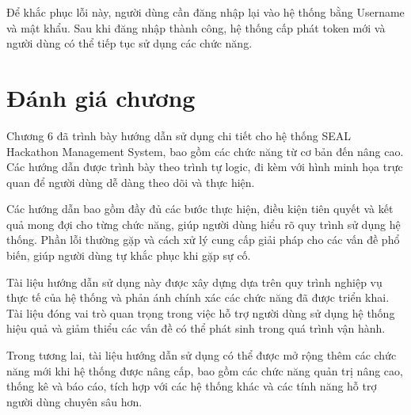 Để khắc phục lỗi này, người dùng cần đăng nhập lại vào hệ thống bằng Username và mật khẩu. Sau khi đăng nhập thành công, hệ thống cấp phát token mới và người dùng có thể tiếp tục sử dụng các chức năng.


\section{Đánh giá chương}

Chương 6 đã trình bày hướng dẫn sử dụng chi tiết cho hệ thống SEAL Hackathon Management System, bao gồm các chức năng từ cơ bản đến nâng cao. Các hướng dẫn được trình bày theo trình tự logic, đi kèm với hình minh họa trực quan để người dùng dễ dàng theo dõi và thực hiện.

Các hướng dẫn bao gồm đầy đủ các bước thực hiện, điều kiện tiên quyết và kết quả mong đợi cho từng chức năng, giúp người dùng hiểu rõ quy trình sử dụng hệ thống. Phần lỗi thường gặp và cách xử lý cung cấp giải pháp cho các vấn đề phổ biến, giúp người dùng tự khắc phục khi gặp sự cố.

Tài liệu hướng dẫn sử dụng này được xây dựng dựa trên quy trình nghiệp vụ thực tế của hệ thống và phản ánh chính xác các chức năng đã được triển khai. Tài liệu đóng vai trò quan trọng trong việc hỗ trợ người dùng sử dụng hệ thống hiệu quả và giảm thiểu các vấn đề có thể phát sinh trong quá trình vận hành.

Trong tương lai, tài liệu hướng dẫn sử dụng có thể được mở rộng thêm các chức năng mới khi hệ thống được nâng cấp, bao gồm các chức năng quản trị nâng cao, thống kê và báo cáo, tích hợp với các hệ thống khác và các tính năng hỗ trợ người dùng chuyên sâu hơn.
